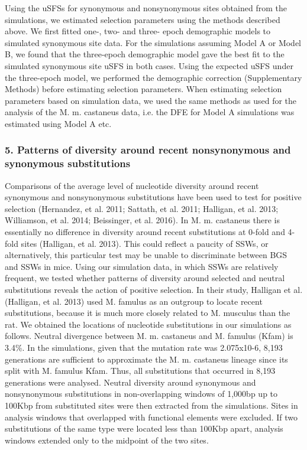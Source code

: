 Using the uSFSs for synonymous and nonsynonymous sites obtained from the simulations, we estimated selection parameters using the methods described above. We first fitted one-, two- and three- epoch demographic models to simulated synonymous site data. For the simulations assuming Model A or Model B, we found that the three-epoch demographic model gave the best fit to the simulated synonymous site uSFS in both cases. Using the expected uSFS under the three-epoch model, we performed the demographic correction (Supplementary Methods) before estimating selection parameters. When estimating selection parameters based on simulation data, we used the same methods as used for the analysis of the M. m. castaneus data, i.e. the DFE for Model A simulations was estimated using Model A etc.

\subsubsection{5. Patterns of diversity around recent nonsynonymous and synonymous substitutions}

Comparisons of the average level of nucleotide diversity around recent synonymous and nonsynonymous substitutions have been used to test for positive selection (Hernandez, et al. 2011; Sattath, et al. 2011; Halligan, et al. 2013; Williamson, et al. 2014; Beissinger, et al. 2016). In M. m. castaneus there is essentially no difference in diversity around recent substitutions at 0-fold and 4-fold sites (Halligan, et al. 2013). This could reflect a paucity of SSWs, or alternatively, this particular test may be unable to discriminate between BGS and SSWs in mice. Using our simulation data, in which SSWs are relatively frequent, we tested whether patterns of diversity around selected and neutral substitutions reveals the action of positive selection. In their study, Halligan et al. (Halligan, et al. 2013) used M. famulus as an outgroup to locate recent substitutions, because it is much more closely related to M. musculus than the rat. We obtained the locations of nucleotide substitutions in our simulations as follows. Neutral divergence between M. m. castaneus and M. famulus (Kfam) is 3.4\%. In the simulations, given that the mutation rate was 2.075x10-6, 8,193 generations are sufficient to approximate the M. m. castaneus lineage since its split with M. famulus Kfam. Thus, all substitutions that occurred in 8,193 generations were analysed. Neutral diversity around synonymous and nonsynonymous substitutions in non-overlapping windows of 1,000bp up to 100Kbp from substituted sites were then extracted from the simulations. Sites in analysis windows that overlapped with functional elements were excluded. If two substitutions of the same type were located less than 100Kbp apart, analysis windows extended only to the midpoint of the two sites.
 
